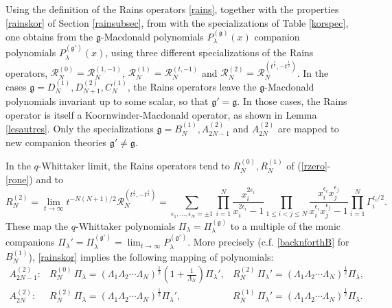 \documentclass[12pt]{amsart}
\newcommand{\g}{{\mathfrak{g}}}
\newcommand{\lL}{{\Lambda}}
\newcommand{\half}{\frac{1}{2}}
\numberwithin{equation}{section}
\begin{document}
Using the definition of the Rains operators \eqref{rains}, together with the properties \eqref{rainskor} of Section \ref{rainsubsec}, 
from with the specializations of Table \ref{korspec}, one obtains from the $\g$-Macdonald polynomials 
$P_\lambda^{(\g)}(x)$ companion polynomials $P_\lambda^{(\g')}(x)$, using 
three different specializations of the  Rains operators, 
${\mathcal R}_N^{(0)}={\mathcal R}_N^{(1,-1)}$,  ${\mathcal R}_N^{(1)}={\mathcal R}_N^{(t,-1)}$ and ${\mathcal R}_N^{(2)}={\mathcal R}_N^{(t^\half,-t^\half)}$. 
In the cases $\g=D_N^{(1)},D_{N+1}^{(2)},C_N^{(1)}$, the Rains operators
leave the $\g$-Macdonald polynomials invariant up to some scalar, so that $\g'=\g$. In those cases, the Rains operator is itself a Koornwinder-Macdonald operator, as shown in Lemma \ref{lesautres}. 
Only the specializations $\g=B_N^{(1)},A_{2N-1}^{(2)}$ and $A_{2N}^{(2)}$ are mapped to new companion theories $\g'\neq \g$.

In the $q$-Whittaker limit, the Rains operators tend to $R_N^{(0)},R_N^{(1)}$
of  (\ref{rzero}-\ref{rone}) and to
$$R^{(2)}_N= \lim_{t\to\infty} t^{-N(N+1)/2} {\mathcal R}_N^{(t^\half,-t^\half)}=
\sum_{\epsilon_1,\ldots,\epsilon_N=\pm 1} \prod_{i=1}^N \frac{x_i^{2\epsilon_i}}{x_i^{2\epsilon_i}-1} \prod_{1\leq i<j\leq N}
\frac{x_i^{\epsilon_i}x_j^{\epsilon_j}}{x_i^{\epsilon_i}x_j^{\epsilon_j}-1} \prod_{i=1}^N \Gamma_i^{{\epsilon_i}/2}.$$
These map the $q$-Whittaker polynomials $\Pi_\lambda=\Pi_\lambda^{(\g)}$ to a multiple of the
monic companions $\Pi_\lambda'=\Pi_\lambda^{(\g')}=\lim_{t\to\infty} P_\lambda^{(\g')}$.
More precisely (c.f. \eqref{backnforthB} for $B_N^{(1)}$), \eqref{rainskor} implies the following mapping of polynomials:
$$
\begin{array}{rll}
A_{2N-1}^{(2)}:&  R^{(0)}_N\, \Pi_\lambda=(\lL_1\lL_2\cdots \lL_N)^\half\left(1+\frac{1}{\lL_N}\right) \Pi_\lambda',&
R^{(2)}_N\, \Pi_\lambda'= (\lL_1\lL_2\cdots \lL_N)^\half \Pi_\lambda,\\
A_{2N}^{(2)}:&  R^{(2)}_N\, \Pi_\lambda
= (\lL_1\lL_2\cdots \lL_N)^\half \Pi_\lambda',\quad &
R^{(1)}_N\, \Pi_\lambda'= (\lL_1\lL_2\cdots \lL_N)^\half \Pi_\lambda.
\end{array}
$$
\end{document}
